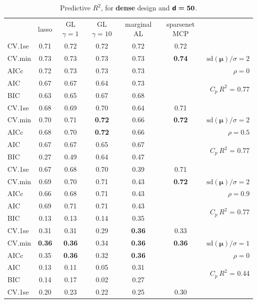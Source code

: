 \documentclass[12pt]{article}
\newcommand{\mr}[1]{\mathrm{#1}}
\newcommand{\bm}[1]{\mathbf{#1}}
\begin{document}
\begin{table}[p]\vspace{-.5cm}
\caption[l]{ Predictive $R^2$, for {\bf dense} design and  $\boldsymbol{{\sf d}=50}$.}
\vspace{-.5cm}
\small{}
\begin{center}
\begin{tabular}{l*{5}{c}|r}
 & lasso & GL $\gamma=1$ & GL $\gamma=10$ & marginal AL & sparsenet MCP  &  \\
\cline{1-7}
CV.1se & 0.71 & 0.72 & 0.72 & 0.72 & 0.72 &\\
CV.min & 0.73 & 0.73 & 0.73 & 0.73 & {\bf 0.74} &  $\mr{sd}(\bm{\mu})/\sigma=2$ \\
AICc & 0.72 & 0.73 & 0.73 & 0.73 & & $\rho=0$ \\
AIC & 0.67 & 0.67 & 0.64 & 0.73 & & \multirow{2}{*}{$C_p ~ R^2$ = 0.77} \\
BIC & 0.63 & 0.65 & 0.67 & 0.68 & & \\
 \hline 
CV.1se & 0.68 & 0.69 & 0.70 & 0.64 & 0.71 &\\
CV.min & 0.70 & 0.71 & {\bf 0.72} & 0.66 & {\bf 0.72} &  $\mr{sd}(\bm{\mu})/\sigma=2$ \\
AICc & 0.68 & 0.70 & {\bf 0.72} & 0.66 & & $\rho=0.5$ \\
AIC & 0.67 & 0.67 & 0.65 & 0.67 & & \multirow{2}{*}{$C_p ~ R^2$ = 0.77} \\
BIC & 0.27 & 0.49 & 0.64 & 0.47 & & \\
 \hline 
CV.1se & 0.67 & 0.68 & 0.70 & 0.39 & 0.71 &\\
CV.min & 0.69 & 0.70 & 0.71 & 0.43 & {\bf 0.72} &  $\mr{sd}(\bm{\mu})/\sigma=2$ \\
AICc & 0.66 & 0.68 & 0.71 & 0.43 & & $\rho=0.9$ \\
AIC & 0.69 & 0.71 & 0.71 & 0.43 & & \multirow{2}{*}{$C_p ~ R^2$ = 0.77} \\
BIC & 0.13 & 0.13 & 0.14 & 0.35 & & \\
 \hline 
CV.1se & 0.31 & 0.31 & 0.29 & {\bf 0.36} & 0.33 &\\
CV.min & {\bf 0.36} & {\bf 0.36} & 0.34 & {\bf 0.36} & {\bf 0.36} &  $\mr{sd}(\bm{\mu})/\sigma=1$ \\
AICc & 0.35 & {\bf 0.36} & 0.32 & {\bf 0.36} & & $\rho=0$ \\
AIC & 0.13 & 0.11 & 0.05 & 0.31 & & \multirow{2}{*}{$C_p ~ R^2$ = 0.44} \\
BIC & 0.14 & 0.17 & 0.02 & 0.27 & & \\
 \hline 
CV.1se & 0.20 & 0.23 & 0.22 & 0.25 & 0.30 &\\

\end{tabular}
\end{center}
\end{table}
\end{document}
